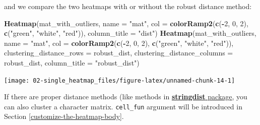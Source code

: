 \documentclass[]{book}
\newenvironment{Shaded}{\begin{snugshade}}{\end{snugshade}}
\newcommand{\KeywordTok}[1]{\textcolor[rgb]{0.13,0.29,0.53}{\textbf{#1}}}
\newcommand{\DataTypeTok}[1]{\textcolor[rgb]{0.13,0.29,0.53}{#1}}
\newcommand{\DecValTok}[1]{\textcolor[rgb]{0.00,0.00,0.81}{#1}}
\newcommand{\StringTok}[1]{\textcolor[rgb]{0.31,0.60,0.02}{#1}}
\newcommand{\OperatorTok}[1]{\textcolor[rgb]{0.81,0.36,0.00}{\textbf{#1}}}
\newcommand{\NormalTok}[1]{#1}
\theoremstyle{definition}
\theoremstyle{definition}
\theoremstyle{definition}
\theoremstyle{remark}
\begin{document}
and we compare the two heatmaps with or without the robust distance
method:

\begin{Shaded}
\begin{Highlighting}[]
\KeywordTok{Heatmap}\NormalTok{(mat_with_outliers, }\DataTypeTok{name =} \StringTok{"mat"}\NormalTok{, }
    \DataTypeTok{col =} \KeywordTok{colorRamp2}\NormalTok{(}\KeywordTok{c}\NormalTok{(}\OperatorTok{-}\DecValTok{2}\NormalTok{, }\DecValTok{0}\NormalTok{, }\DecValTok{2}\NormalTok{), }\KeywordTok{c}\NormalTok{(}\StringTok{"green"}\NormalTok{, }\StringTok{"white"}\NormalTok{, }\StringTok{"red"}\NormalTok{)),}
    \DataTypeTok{column_title =} \StringTok{"dist"}\NormalTok{)}
\KeywordTok{Heatmap}\NormalTok{(mat_with_outliers, }\DataTypeTok{name =} \StringTok{"mat"}\NormalTok{, }
    \DataTypeTok{col =} \KeywordTok{colorRamp2}\NormalTok{(}\KeywordTok{c}\NormalTok{(}\OperatorTok{-}\DecValTok{2}\NormalTok{, }\DecValTok{0}\NormalTok{, }\DecValTok{2}\NormalTok{), }\KeywordTok{c}\NormalTok{(}\StringTok{"green"}\NormalTok{, }\StringTok{"white"}\NormalTok{, }\StringTok{"red"}\NormalTok{)),}
    \DataTypeTok{clustering_distance_rows =}\NormalTok{ robust_dist,}
    \DataTypeTok{clustering_distance_columns =}\NormalTok{ robust_dist,}
    \DataTypeTok{column_title =} \StringTok{"robust_dist"}\NormalTok{)}
\end{Highlighting}
\end{Shaded}

\begin{center}\texttt{[image: 02-single\_heatmap\_files/figure-latex/unnamed-chunk-14-1]} \end{center}

If there are proper distance methods (like methods in
\href{https://cran.r-project.org/web/packages/stringdist/}{\textbf{stringdist}
package}, you can also cluster a character matrix. \texttt{cell\_fun}
argument will be introduced in Section \ref{customize-the-heatmap-body}.
\end{document}
